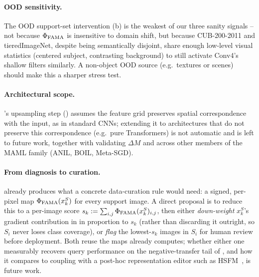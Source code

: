 \paragraph{OOD sensitivity.} The OOD support-set intervention (b) is the weakest of our three sanity signals -- not because $\Phi_{\mathrm{FAMA}}$ is insensitive to domain shift, but because CUB-200-2011 and tieredImageNet, despite being semantically disjoint, share enough low-level visual statistics (centered subject, contrasting background) to still activate Conv4's shallow filters similarly. A non-object OOD source (e.g.\ textures or scenes) should make this a sharper stress test.

\paragraph{Architectural scope.} \fama's upsampling step () assumes the feature grid preserves spatial correspondence with the input, as in standard CNNs; extending it to architectures that do not preserve this correspondence (e.g.\ pure Transformers) is not automatic and is left to future work, together with validating $\Delta M$ and \fama across other members of the MAML family (ANIL, BOIL, Meta-SGD).

\paragraph{From diagnosis to curation.}  already produces what a concrete data-curation rule would need: a signed, per-pixel map $\Phi_{\mathrm{FAMA}}(x_k^S)$ for every support image. A direct proposal is to reduce this to a per-image score $s_k := \sum_{i,j}\Phi_{\mathrm{FAMA}}(x_k^S)_{i,j}$, then either \emph{down-weight} $x_k^S$'s gradient contribution in  in proportion to $s_k$ (rather than discarding it outright, so $S_i$ never loses class coverage), or \emph{flag} the lowest-$s_k$ images in $S_i$ for human review before deployment. Both reuse the maps \fama already computes; whether either one measurably recovers query performance on the negative-transfer tail of , and how it compares to coupling \fama with a post-hoc representation editor such as HSFM~\cite{parast2026hsfm}, is future work.
